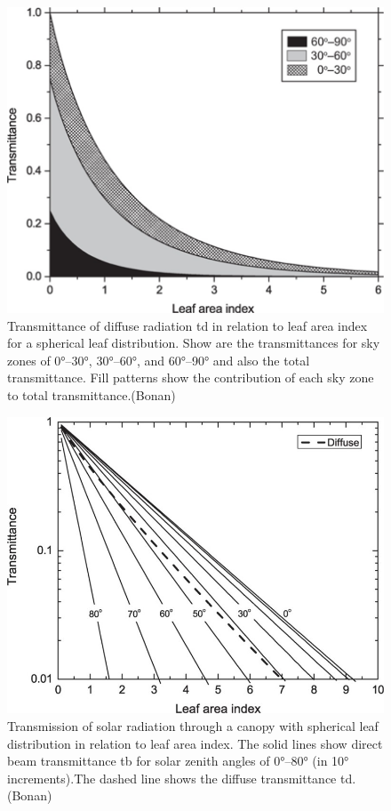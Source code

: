 \documentclass[
  oneside]{book}
\begin{document}
\begin{figure}

{\centering \includegraphics[width=0.8\linewidth]{figures/chap3/f317_diff_trans} 

}

\caption{Transmittance of diffuse radiation td in relation to leaf area index for a spherical leaf distribution. Show are the transmittances for sky zones of 0°–30°, 30°–60°, and 60°–90° and also the total transmittance. Fill patterns show the contribution of each sky zone to total transmittance.(Bonan)}\label{fig:f317}
\end{figure}

\begin{figure}

{\centering \includegraphics[width=0.8\linewidth]{figures/chap3/f318_diff_dir_trans} 

}

\caption{Transmission of solar radiation through a canopy with spherical leaf distribution in relation to leaf area index. The solid lines show direct beam transmittance tb for solar zenith angles of 0°–80° (in 10° increments).The dashed line shows the diffuse transmittance td. (Bonan)}\label{fig:f318}
\end{figure}
\end{document}
